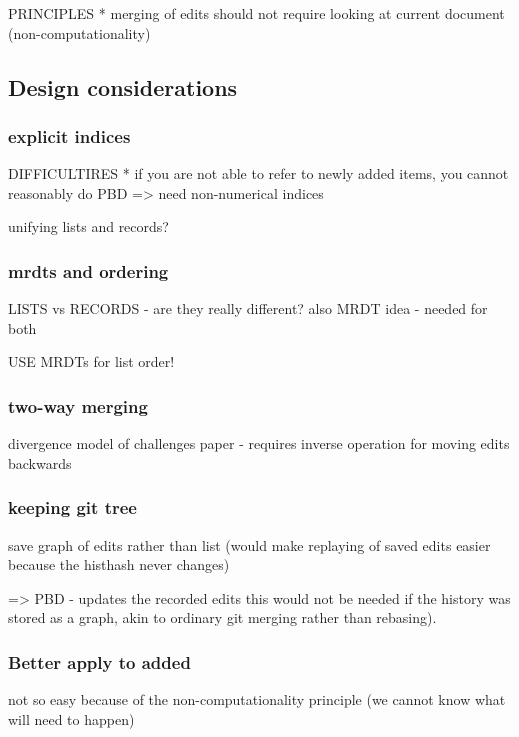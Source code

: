 \documentclass[sigconf,anonymous,screen]{acmart}
\begin{document}
PRINCIPLES
* merging of edits should not require looking at current document (non-computationality)


\subsection{Design considerations}
\label{sec:discuss-considerations}

\subsubsection*{explicit indices}
DIFFICULTIRES
* if you are not able to refer to newly added items, you cannot reasonably do PBD
  => need non-numerical indices

unifying lists and records?

\subsubsection*{mrdts and ordering}
LISTS vs RECORDS
- are they really different? also MRDT idea - needed for both


USE MRDTs for list order!

\subsubsection*{two-way merging}
divergence model of challenges paper - requires inverse operation for moving edits backwards

\subsubsection*{keeping git tree}

save graph of edits rather than list
(would make replaying of saved edits easier because the histhash never changes)

=> PBD - updates the recorded edits this would not be needed if the
history was stored as a graph, akin to ordinary git merging rather than rebasing).

\subsubsection*{Better apply to added}

not so easy because of the non-computationality principle
(we cannot know what will need to happen)
\end{document}
